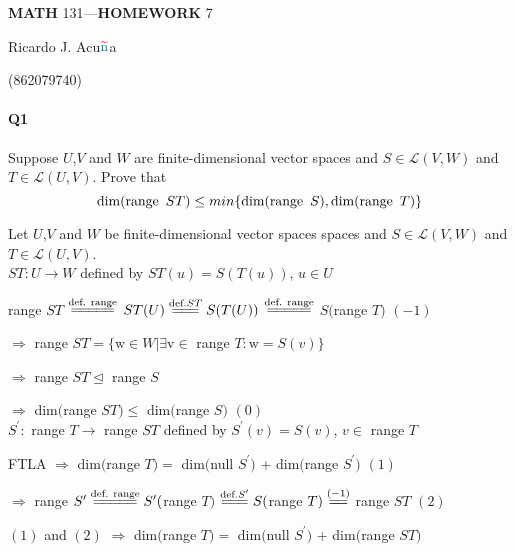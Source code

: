 \documentclass{article}
\begin{document}
\begin{center}
  \textbf{MATH} 131---\textbf{HOMEWORK} 7

  \color{red}R\color{teal}icardo
  \color{red}J\color{cyan}.
  \color{red}A\color{teal}cu$\color{red}{\widetilde{\color{teal}\text{n}}}$\color{teal}a\color{black}

  \color{teal}(\color{red}862079740\color{teal})\color{black}
\end{center}\vspace{1.618em}

\paragraph{Q1} Suppose $U$,$V$ and $W$ are finite-dimensional vector
spaces and $S \in \mathcal{L}(V,W)$ and $T \in
\mathcal{L}(U,V)$. Prove that
\[\text{dim(range}\enskip ST) \leq min\{\text{dim(range}\enskip
  S), \text{dim(range}\enskip T)\}\]
\vspace{0.618 em}

Let $U$,$V$ and $W$ be finite-dimensional vector spaces
spaces and $S \in \mathcal{L}(V,W)$ and $T \in
\mathcal{L}(U,V)$.\\

$ST: U \rightarrow W$ defined by $ST(u) = S(T(u))$, $u \in U$

range $ST$
$\stackrel{\text{def. range}}{=\joinrel=\joinrel=\joinrel=\joinrel=}$
$ST(U) \stackrel{\text{def.}ST}{=\joinrel=\joinrel=} S(T(U))$
$\stackrel{\text{def. range}}{=\joinrel=\joinrel=\joinrel=\joinrel=}$
$S$$($range $T)$ $(-1)$

$\Rightarrow$ range $ST = \{\mathrm{w} \in W | \exists \mathrm{v} \in$ range $T:
\mathrm{w} = S(v)\}$

$\Rightarrow$ range $ST \trianglelefteq$ range $S$

$\Rightarrow$ dim$($range $ST) \leq$ dim$($range $S)$ $(0)$\\

$S^\prime:$ range $T \rightarrow$ range $ST$ defined by
$S^\prime(v) = S(v)$, $v \in$ range $T$

FTLA $\Rightarrow$ dim$($range $T) =$ dim$($null $S^\prime)$ +
dim$($range $S^\prime)$ $(1)$

$\Rightarrow$ range $S^\prime
\stackrel{\text{def. range}}{=\joinrel=\joinrel=\joinrel=\joinrel=}
S^\prime($range $T)$
$\stackrel{\text{def.}S^\prime}{=\joinrel=\joinrel=} S($range $T)
\stackrel{(-1)}{=\joinrel=} $ range $ST$ $(2)$

$(1)$ and $(2)$ $\Rightarrow$ dim$($range $T) =$ dim$($null $S^\prime)$ + dim$($range
$ST)$
\end{document}
